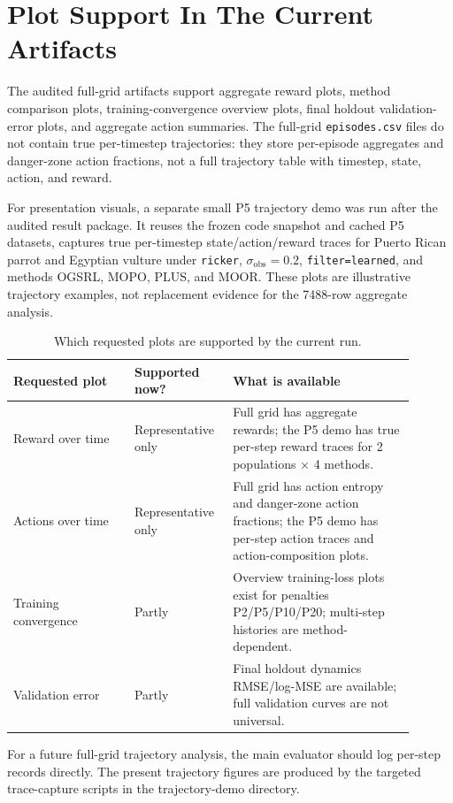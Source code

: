 \documentclass[11pt]{article}
\begin{document}
\section{Plot Support In The Current Artifacts}

The audited full-grid artifacts support aggregate reward plots, method
comparison plots, training-convergence overview plots, final holdout
validation-error plots, and aggregate action summaries. The full-grid
\texttt{episodes.csv} files do not contain true per-timestep trajectories:
they store per-episode aggregates and danger-zone action fractions, not a full
trajectory table with timestep, state, action, and reward.

For presentation visuals, a separate small P5 trajectory demo was run after the
audited result package. It reuses the frozen code snapshot and cached P5
datasets, captures true per-timestep state/action/reward traces for Puerto
Rican parrot and Egyptian vulture under \texttt{ricker},
$\sigma_{\mathrm{obs}}=0.2$, \texttt{filter=learned}, and methods OGSRL, MOPO,
PLUS, and MOOR. These plots are illustrative trajectory examples, not
replacement evidence for the 7488-row aggregate analysis.

\begin{table}[htbp]
\centering
\caption{Which requested plots are supported by the current run.}
\begin{tabular}{p{0.28\linewidth}p{0.2\linewidth}p{0.42\linewidth}}
\toprule
Requested plot & Supported now? & What is available \\
\midrule
Reward over time & Representative only & Full grid has aggregate rewards; the P5 demo has true per-step reward traces for 2 populations $\times$ 4 methods. \\
Actions over time & Representative only & Full grid has action entropy and danger-zone action fractions; the P5 demo has per-step action traces and action-composition plots. \\
Training convergence & Partly & Overview training-loss plots exist for penalties P2/P5/P10/P20; multi-step histories are method-dependent. \\
Validation error & Partly & Final holdout dynamics RMSE/log-MSE are available; full validation curves are not universal. \\
\bottomrule
\end{tabular}
\end{table}

For a future full-grid trajectory analysis, the main evaluator should log
per-step records directly. The present trajectory figures are produced by the
targeted trace-capture scripts in the trajectory-demo directory.
\end{document}
